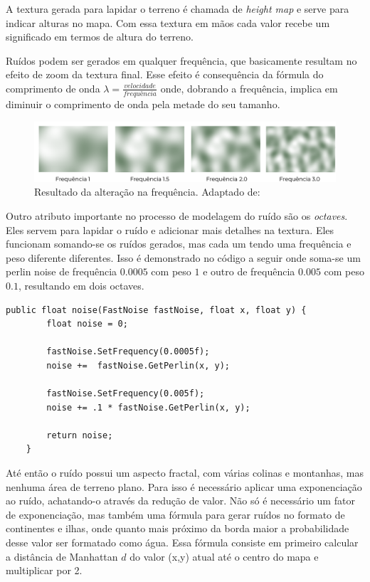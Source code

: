 \documentclass[12pt, 
openright, 
oneside, 
a4paper,    
brazil]{facom-ufu-abntex2}
\begin{document}
A textura gerada para lapidar o terreno é chamada de \textit{height map} e serve para indicar alturas no mapa. Com essa textura em mãos cada valor recebe um significado em termos de altura do terreno.

Ruídos podem ser gerados em qualquer frequência, que basicamente resultam no efeito de zoom da textura final. Esse efeito é consequência da fórmula do comprimento de onda $\lambda = \frac{velocidade}{frequência}$ onde, dobrando a frequência, implica em diminuir o comprimento de onda pela metade do seu tamanho.

\begin{figure}[H]
	\centering
	\includegraphics[width=34em]{imagens/perlinFrequencies.png}
	\caption{Resultado da alteração na frequência. Adaptado de: \cite{NoiseRedBlob}}
\end{figure}


Outro atributo importante no processo de modelagem do ruído são os \textit{octaves}. Eles servem para lapidar o ruído e adicionar mais detalhes na textura. Eles funcionam somando-se os ruídos gerados, mas cada um tendo uma frequência e peso diferente diferentes. Isso é demonstrado no código a seguir onde soma-se um perlin noise de frequência $0.0005$ com peso $1$ e outro de frequência $0.005$ com peso $0.1$, resultando em dois octaves.

\begin{lstlisting}[caption=Implementação do ruído que usa o perlin noise com dois octaves]
public float noise(FastNoise fastNoise, float x, float y) {
		float noise = 0;
		
		fastNoise.SetFrequency(0.0005f);	
		noise +=  fastNoise.GetPerlin(x, y);

		fastNoise.SetFrequency(0.005f);
		noise += .1 * fastNoise.GetPerlin(x, y);
		
		return noise;
	}
\end{lstlisting}   

Até então o ruído possui um aspecto fractal, com várias colinas e montanhas, mas nenhuma área de terreno plano. Para isso é necessário aplicar uma exponenciação ao ruído, achatando-o através da redução de valor. Não só é necessário um fator de exponenciação, mas também uma fórmula para gerar ruídos no formato de continentes e ilhas, onde quanto mais próximo da borda maior a probabilidade desse valor ser formatado como água. Essa fórmula consiste em primeiro calcular a distância de Manhattan $d$ do valor (x,y) atual até o centro do mapa e multiplicar por 2.
\end{document}
